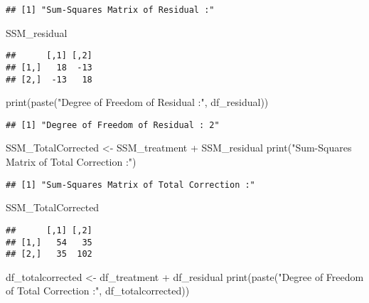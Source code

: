 \documentclass[
]{article}
\newenvironment{Shaded}{\begin{snugshade}}{\end{snugshade}}
\newcommand{\FunctionTok}[1]{\textcolor[rgb]{0.00,0.00,0.00}{#1}}
\newcommand{\NormalTok}[1]{#1}
\newcommand{\OtherTok}[1]{\textcolor[rgb]{0.56,0.35,0.01}{#1}}
\newcommand{\SpecialCharTok}[1]{\textcolor[rgb]{0.00,0.00,0.00}{#1}}
\newcommand{\StringTok}[1]{\textcolor[rgb]{0.31,0.60,0.02}{#1}}
\begin{document}
\begin{verbatim}
## [1] "Sum-Squares Matrix of Residual :"
\end{verbatim}

\begin{Shaded}
\begin{Highlighting}[]
\NormalTok{SSM\_residual}
\end{Highlighting}
\end{Shaded}

\begin{verbatim}
##      [,1] [,2]
## [1,]   18  -13
## [2,]  -13   18
\end{verbatim}

\begin{Shaded}
\begin{Highlighting}[]
\FunctionTok{print}\NormalTok{(}\FunctionTok{paste}\NormalTok{(}\StringTok{"Degree of Freedom of Residual :"}\NormalTok{, df\_residual))}
\end{Highlighting}
\end{Shaded}

\begin{verbatim}
## [1] "Degree of Freedom of Residual : 2"
\end{verbatim}

\begin{Shaded}
\begin{Highlighting}[]
\NormalTok{SSM\_TotalCorrected }\OtherTok{\textless{}{-}}\NormalTok{ SSM\_treatment }\SpecialCharTok{+}\NormalTok{ SSM\_residual}
\FunctionTok{print}\NormalTok{(}\StringTok{"Sum{-}Squares Matrix of Total Correction :"}\NormalTok{)}
\end{Highlighting}
\end{Shaded}

\begin{verbatim}
## [1] "Sum-Squares Matrix of Total Correction :"
\end{verbatim}

\begin{Shaded}
\begin{Highlighting}[]
\NormalTok{SSM\_TotalCorrected}
\end{Highlighting}
\end{Shaded}

\begin{verbatim}
##      [,1] [,2]
## [1,]   54   35
## [2,]   35  102
\end{verbatim}

\begin{Shaded}
\begin{Highlighting}[]
\NormalTok{df\_totalcorrected }\OtherTok{\textless{}{-}}\NormalTok{ df\_treatment }\SpecialCharTok{+}\NormalTok{ df\_residual}
\FunctionTok{print}\NormalTok{(}\FunctionTok{paste}\NormalTok{(}\StringTok{"Degree of Freedom of Total Correction :"}\NormalTok{, df\_totalcorrected))}
\end{Highlighting}
\end{Shaded}
\end{document}
